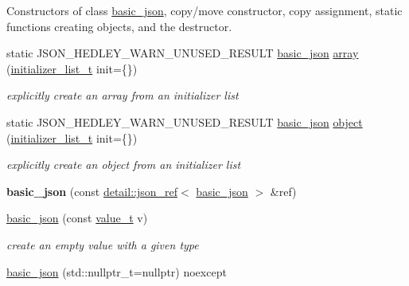 Constructors of class \mbox{\hyperlink{classnlohmann_1_1basic__json}{basic\+\_\+json}}, copy/move constructor, copy assignment, static functions creating objects, and the destructor. \begin{DoxyCompactItemize}
\item 
static J\+S\+O\+N\+\_\+\+H\+E\+D\+L\+E\+Y\+\_\+\+W\+A\+R\+N\+\_\+\+U\+N\+U\+S\+E\+D\+\_\+\+R\+E\+S\+U\+LT \mbox{\hyperlink{classnlohmann_1_1basic__json}{basic\+\_\+json}} \mbox{\hyperlink{classnlohmann_1_1basic__json_a8a7d537fc297bbc5b845f92fe0445e3b}{array}} (\mbox{\hyperlink{classnlohmann_1_1basic__json_ad70a098fbc01c53497db29d3b5b656a9}{initializer\+\_\+list\+\_\+t}} init=\{\})
\begin{DoxyCompactList}\small\item\em explicitly create an array from an initializer list \end{DoxyCompactList}\item 
static J\+S\+O\+N\+\_\+\+H\+E\+D\+L\+E\+Y\+\_\+\+W\+A\+R\+N\+\_\+\+U\+N\+U\+S\+E\+D\+\_\+\+R\+E\+S\+U\+LT \mbox{\hyperlink{classnlohmann_1_1basic__json}{basic\+\_\+json}} \mbox{\hyperlink{classnlohmann_1_1basic__json_a31f84ee15c4690ff705bed74736d04c6}{object}} (\mbox{\hyperlink{classnlohmann_1_1basic__json_ad70a098fbc01c53497db29d3b5b656a9}{initializer\+\_\+list\+\_\+t}} init=\{\})
\begin{DoxyCompactList}\small\item\em explicitly create an object from an initializer list \end{DoxyCompactList}\item 
\mbox{\label{classnlohmann_1_1basic__json_a2be0a411fe0e3418abc4c58889be4943}} 
{\bfseries basic\+\_\+json} (const \mbox{\hyperlink{classnlohmann_1_1detail_1_1json__ref}{detail\+::json\+\_\+ref}}$<$ \mbox{\hyperlink{classnlohmann_1_1basic__json}{basic\+\_\+json}} $>$ \&ref)
\item 
\mbox{\hyperlink{classnlohmann_1_1basic__json_aed115142bd0c6c66c864700e0467df55}{basic\+\_\+json}} (const \mbox{\hyperlink{namespacenlohmann_1_1detail_a1ed8fc6239da25abcaf681d30ace4985}{value\+\_\+t}} v)
\begin{DoxyCompactList}\small\item\em create an empty value with a given type \end{DoxyCompactList}\item 
\mbox{\hyperlink{classnlohmann_1_1basic__json_ae9be9e956bfc4658f35d17c6aa72b063}{basic\+\_\+json}} (std\+::nullptr\+\_\+t=nullptr) noexcept

\end{DoxyCompactItemize}
